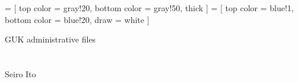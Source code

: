 

\renewcommand\Routcolor{\color{gray30}}
\newtheorem{finding}{Finding}[section]
\makeatletter
\g@addto@macro{\UrlBreaks}{\UrlOrds}
\newcommand\gobblepars{%
    \@ifnextchar\par%
        {\expandafter\gobblepars\@gobble}%
        {}}
\newenvironment{lightgrayleftbar}{%
  \def\FrameCommand{\textcolor{lightgray}{\vrule width 1zw} \hspace{10pt}}%
  \MakeFramed {\advance\hsize-\width \FrameRestore}}%
{\endMakeFramed}
\newenvironment{palepinkleftbar}{%
  \def\FrameCommand{\textcolor{palepink}{\vrule width 1zw} \hspace{10pt}}%
  \MakeFramed {\advance\hsize-\width \FrameRestore}}%
{\endMakeFramed}
\makeatother
\usepackage{caption}
\usepackage{setspace}
\usepackage{framed}
\def\pgfsysdriver{pgfsys-dvipdfm.def}
\usepackage{tikz}
\usetikzlibrary{calc, arrows, decorations, decorations.pathreplacing, backgrounds}
\usepackage{adjustbox}
 =
[
top color = gray!20, bottom color = gray!50, thick
]
 =
[
top color = blue!1, bottom color = blue!20, draw = white
]



\setlength{\baselineskip}{12pt}








\hfil GUK administrative files\\

\hfil\MonthDY\\
\hfil{\footnotesize\currenttime}\\

\hfil Seiro Ito

\setcounter{tocdepth}{3}
\tableofcontents

\setlength{\parindent}{1em}
\vspace{2ex}


